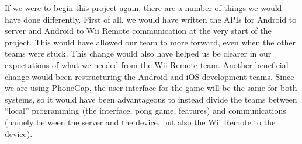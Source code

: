 \documentclass[12pt]{article}
\begin{document}
If we were to begin this project again, there are a number of things we would have done differently.  First of all, we would have written the APIs for Android to server and Android to Wii Remote communication at the very start of the project.  This would have allowed our team to more forward, even when the other teams were stuck.  This change would also have helped us be clearer in our expectations of what we needed from the Wii Remote team.  Another beneficial change would been restructuring the Android and iOS development teams.  Since we are using PhoneGap, the user interface for the game will be the same for both systems, so it would have been advantageous to instead divide the teams between “local” programming (the interface, pong game, features) and communications (namely between the server and the device, but also the Wii Remote to the device). 
\end{document}

